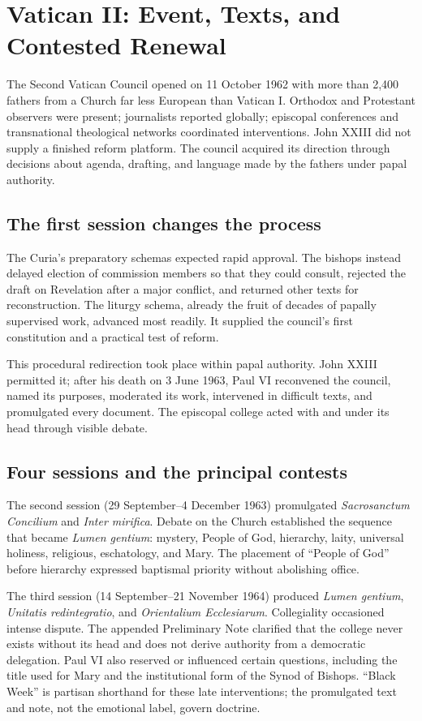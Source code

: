 \section{Vatican II: Event, Texts, and Contested Renewal}

The Second Vatican Council opened on 11 October 1962 with more than 2,400 fathers from a Church far less European than Vatican I. Orthodox and Protestant observers were present; journalists reported globally; episcopal conferences and transnational theological networks coordinated interventions. John XXIII did not supply a finished reform platform. The council acquired its direction through decisions about agenda, drafting, and language made by the fathers under papal authority.

\subsection{The first session changes the process}

The Curia's preparatory schemas expected rapid approval. The bishops instead delayed election of commission members so that they could consult, rejected the draft on Revelation after a major conflict, and returned other texts for reconstruction. The liturgy schema, already the fruit of decades of papally supervised work, advanced most readily. It supplied the council's first constitution and a practical test of reform.

This procedural redirection took place within papal authority. John XXIII permitted it; after his death on 3 June 1963, Paul VI reconvened the council, named its purposes, moderated its work, intervened in difficult texts, and promulgated every document. The episcopal college acted with and under its head through visible debate.

\subsection{Four sessions and the principal contests}

The second session (29 September--4 December 1963) promulgated \emph{Sacrosanctum Concilium} and \emph{Inter mirifica}. Debate on the Church established the sequence that became \emph{Lumen gentium}: mystery, People of God, hierarchy, laity, universal holiness, religious, eschatology, and Mary. The placement of “People of God” before hierarchy expressed baptismal priority without abolishing office.

The third session (14 September--21 November 1964) produced \emph{Lumen gentium}, \emph{Unitatis redintegratio}, and \emph{Orientalium Ecclesiarum}. Collegiality occasioned intense dispute. The appended Preliminary Note clarified that the college never exists without its head and does not derive authority from a democratic delegation. Paul VI also reserved or influenced certain questions, including the title used for Mary and the institutional form of the Synod of Bishops. “Black Week” is partisan shorthand for these late interventions; the promulgated text and note, not the emotional label, govern doctrine.

